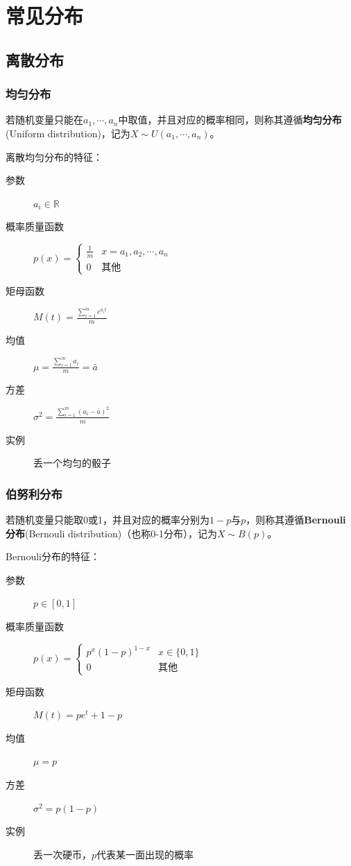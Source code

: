\chapter{常见分布}

\section{离散分布}

\subsection{均匀分布}

\begin{definition}[离散均匀分布]
    若随机变量只能在$a_1,\cdots ,a_n$中取值，并且对应的概率相同，则称其遵循\textbf{均匀分布}(Uniform distribution)，记为$X \sim U(a_1,\cdots ,a_n)$。
\end{definition}

离散均匀分布的特征：
\begin{description}
    \item[参数] $a_i \in \mathbb{R}$
    \item[概率质量函数] $p(x)=\begin{cases}
                \frac{1}{m} & x=a_1,a_2,\cdots ,a_n \\
                0           & \text{其他}
            \end{cases}$
    \item[矩母函数] $M(t)=\frac{\sum_{i=1}^m e^{a_i t}}{m}$
    \item[均值] $\mu=\frac{\sum_{i=1}^m a_i }{m}=\bar{a}$
    \item[方差] $\sigma^2=\frac{\sum_{i=1}^m (a_i-\bar{a})^2 }{m}$
    \item[实例] 丢一个均匀的骰子
\end{description}

\subsection{伯努利分布}

\begin{definition}[Bernouli分布]
    若随机变量只能取0或1，并且对应的概率分别为$1-p$与$p$，则称其遵循\textbf{Bernouli分布}(Bernouli distribution)（也称0-1分布），记为$X \sim B(p)$。
\end{definition}

Bernouli分布的特征：
\begin{description}
    \item[参数] $p \in [0,1]$
    \item[概率质量函数] $p(x)=\begin{cases}
                p^x (1-p)^{1-x} & x \in \{0,1 \} \\
                0               & \text{其他}
            \end{cases}$
    \item[矩母函数] $M(t)=p e^t + 1-p$
    \item[均值] $\mu=p$
    \item[方差] $\sigma^2=p(1-p)$
    \item[实例] 丢一次硬币，$p$代表某一面出现的概率
\end{description}

